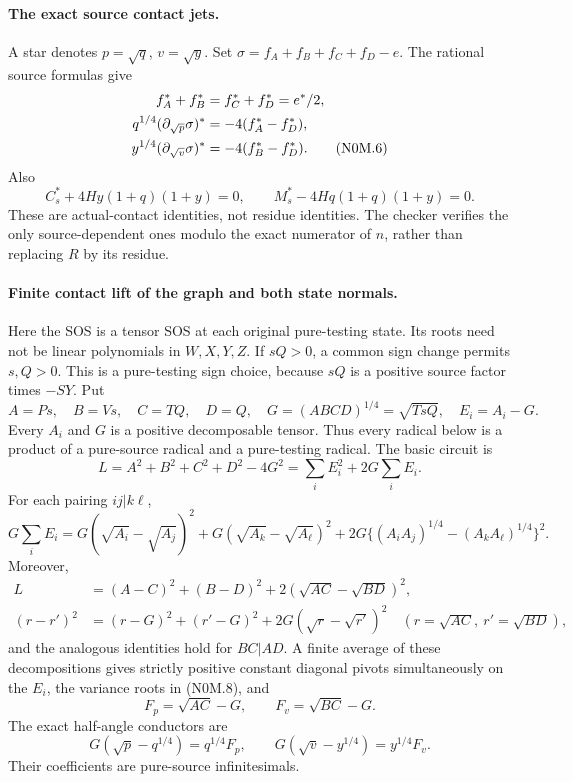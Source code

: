 \paragraph{The exact source contact jets.}
A star denotes $p=\sqrt q$, $v=\sqrt y$. Set
$\sigma=f_A+f_B+f_C+f_D-e$. The rational source formulas give
\begin{align}
 f_A^*+f_B^*&=f_C^*+f_D^*=e^*/2,\notag\\
 q^{1/4}(\partial_{\sqrt p}\sigma)^*
   &=-4(f_A^*-f_D^*),\notag\\
 y^{1/4}(\partial_{\sqrt v}\sigma)^*
   &=-4(f_B^*-f_D^*).                              \tag{N0M.6}
\end{align}
Also
\[
 C_s^*+4Hy(1+q)(1+y)=0,\qquad
 M_s^*-4Hq(1+q)(1+y)=0.                           \tag{N0M.7}
\]
These are actual-contact identities, not residue identities. The checker
verifies the only source-dependent ones modulo the exact numerator of
$n$, rather than replacing $R$ by its residue.

\paragraph{Finite contact lift of the graph and both state normals.}
Here the SOS is a tensor SOS at each original pure-testing state. Its
roots need not be linear polynomials in $W,X,Y,Z$. If $sQ>0$, a common
sign change permits $s,Q>0$. This is a pure-testing sign choice, because
$sQ$ is a positive source factor times $-SY$. Put
\[
 A=Ps,\quad B=Vs,\quad C=TQ,\quad D=Q,
 \quad G=(ABCD)^{1/4}=\sqrt{TsQ},\quad E_i=A_i-G.
\]
Every $A_i$ and $G$ is a positive decomposable tensor. Thus every radical
below is a product of a pure-source radical and a pure-testing radical.
The basic circuit is
\[
 L=A^2+B^2+C^2+D^2-4G^2
   =\sum_iE_i^2+2G\sum_iE_i.                     \tag{N0M.8}
\]
For each pairing $ij|k\ell$,
\[
 G\sum_iE_i=G(\sqrt{A_i}-\sqrt{A_j})^2
 +G(\sqrt{A_k}-\sqrt{A_\ell})^2
 +2G\{(A_iA_j)^{1/4}-(A_kA_\ell)^{1/4}\}^2.
\]
Moreover,
\begin{align*}
 L&=(A-C)^2+(B-D)^2+2(\sqrt{AC}-\sqrt{BD})^2,\\
 (r-r')^2&=(r-G)^2+(r'-G)^2
             +2G(\sqrt r-\sqrt{r'})^2
 \quad(r=\sqrt{AC},\ r'=\sqrt{BD}),
\end{align*}
and the analogous identities hold for $BC|AD$. A finite average of
these decompositions gives strictly positive constant diagonal pivots
simultaneously on the $E_i$, the variance roots in (N0M.8), and
\[
 F_p=\sqrt{AC}-G,\qquad F_v=\sqrt{BC}-G.
\]
The exact half-angle conductors are
\[
 G(\sqrt p-q^{1/4})=q^{1/4}F_p,
 \qquad G(\sqrt v-y^{1/4})=y^{1/4}F_v.          \tag{N0M.9}
\]
Their coefficients are pure-source infinitesimals.

